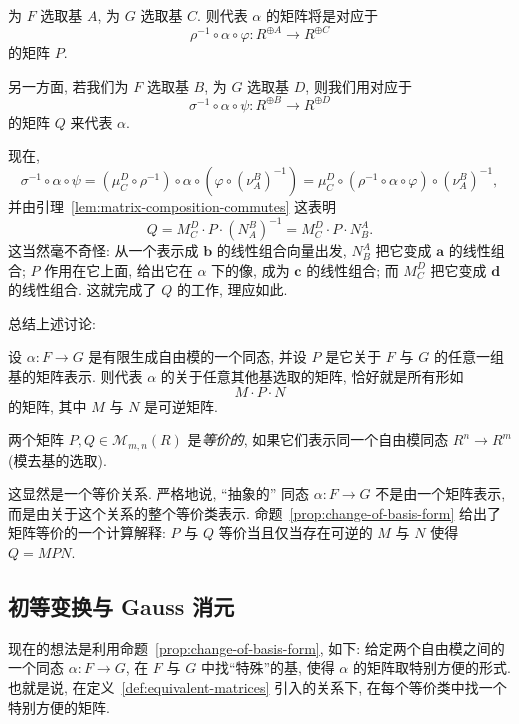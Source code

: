 为 $F$ 选取基 $A$, 为 $G$ 选取基 $C$. 则代表 $\alpha$ 的矩阵将是对应于
\[
\rho^{-1}\circ\alpha\circ\varphi : R^{\oplus A}\to R^{\oplus C}
\]
的矩阵 $P$.

另一方面, 若我们为 $F$ 选取基 $B$, 为 $G$ 选取基 $D$, 则我们用对应于
\[
\sigma^{-1}\circ\alpha\circ\psi : R^{\oplus B}\to R^{\oplus D}
\]
的矩阵 $Q$ 来代表 $\alpha$.

现在,
\[
\sigma^{-1}\circ\alpha\circ\psi = (\mu_C^D\circ\rho^{-1})\circ\alpha\circ(\varphi\circ(\nu_A^B)^{-1}) = \mu_C^D\circ(\rho^{-1}\circ\alpha\circ\varphi)\circ(\nu_A^B)^{-1},
\]
并由引理~\ref{lem:matrix-composition-commutes} 这表明
\[
Q = M_C^D\cdot P\cdot (N_A^B)^{-1} = M_C^D\cdot P\cdot N_B^A.
\]
这当然毫不奇怪: 从一个表示成 $\mathbf{b}$ 的线性组合向量出发, $N_B^A$ 把它变成 $\mathbf{a}$ 的线性组合; $P$ 作用在它上面, 给出它在 $\alpha$ 下的像, 成为 $\mathbf{c}$ 的线性组合; 而 $M_C^D$ 把它变成 $\mathbf{d}$ 的线性组合. 这就完成了 $Q$ 的工作, 理应如此.

总结上述讨论:

\begin{proposition}\label{prop:change-of-basis-form}
设 $\alpha:F\to G$ 是有限生成自由模的一个同态, 并设 $P$ 是它关于 $F$ 与 $G$ 的任意一组基的矩阵表示. 则代表 $\alpha$ 的关于任意其他基选取的矩阵, 恰好就是所有形如
\[
M\cdot P\cdot N
\]
的矩阵, 其中 $M$ 与 $N$ 是可逆矩阵.
\end{proposition}

\begin{definition}\label{def:equivalent-matrices}
两个矩阵 $P,Q\in\mathcal{M}_{m,n}(R)$ 是\emph{等价的}, 如果它们表示同一个自由模同态 $R^n\to R^m$ (模去基的选取).
\end{definition}

这显然是一个等价关系. 严格地说, ``抽象的'' 同态 $\alpha:F\to G$ 不是由一个矩阵表示, 而是由关于这个关系的整个等价类表示. 命题~\ref{prop:change-of-basis-form} 给出了矩阵等价的一个计算解释: $P$ 与 $Q$ 等价当且仅当存在可逆的 $M$ 与 $N$ 使得 $Q=MPN$.

\subsection{初等变换与 Gauss 消元}
\label{subsec:elementary-operations}

现在的想法是利用命题~\ref{prop:change-of-basis-form}, 如下: 给定两个自由模之间的一个同态 $\alpha:F\to G$, 在 $F$ 与 $G$ 中找``特殊''的基, 使得 $\alpha$ 的矩阵取特别方便的形式. 也就是说, 在定义~\ref{def:equivalent-matrices} 引入的关系下, 在每个等价类中找一个特别方便的矩阵.

